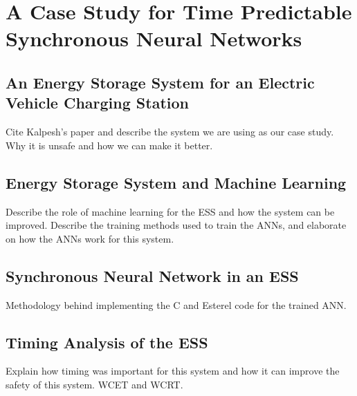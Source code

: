 \section{A Case Study for Time Predictable Synchronous Neural Networks}
\subsection{An Energy Storage System for an Electric Vehicle Charging Station}
Cite Kalpesh's paper and describe the system we are using as our case study. 
Why it is unsafe and how we can make it better.

\subsection{Energy Storage System and Machine Learning}
Describe the role of machine learning for the ESS and how the system can be improved.
Describe the training methods used to train the ANNs, and elaborate on how the ANNs work for this system.

\subsection{Synchronous Neural Network in an ESS}
Methodology behind implementing the C and Esterel code for the trained ANN.

\subsection{Timing Analysis of the ESS}
Explain how timing was important for this system and how it can improve the safety of this system.
WCET and WCRT.